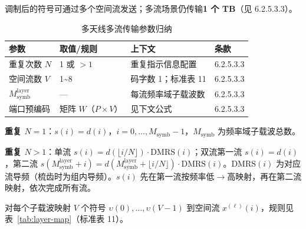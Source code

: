 \documentclass[11pt,a4paper]{ctexart}
\begin{document}
调制后的符号可通过多个空间流发送；多流场景仍传输\textbf{1 个 TB}（见 6.2.5.3.3）。

\begin{table}[h]
\centering
\small
\caption{多天线多流传输参数归纳}
\begin{tabular}{llll}
\toprule
\textbf{参数} & \textbf{取值/规则} & \textbf{上下文} & \textbf{条款} \\
\midrule
重复次数 $N$ & 1 或 $>1$ & 重复指示信息配置 & 6.2.5.3.3 \\
空间流数 $V$ & 1\textasciitilde 8 & 码字数 1；标准表 11 & 6.2.5.3.3 \\
$M_{\mathrm{symb}}^{\mathrm{layer}}$ & --- & 每流频率域子载波数 & 6.2.5.3.3 \\
端口预编码 & 矩阵 $W$（$P \times V$） & 见下文公式 & 6.2.5.3.3 \\
\bottomrule
\end{tabular}
\end{table}

\textbf{重复 $N=1$}：$s(i)=d(i)$，$i=0,\ldots,M_{\mathrm{symb}}-1$，$M_{\mathrm{symb}}$ 为频率域子载波总数。

\textbf{重复 $N>1$}：单流 $s(i)=d(\lfloor i/N\rfloor)\cdot\mathrm{DMRS}(i)$；双流第一流 $s(i)=d(i)$，第二流 $s(M_{\mathrm{symb}}^{\mathrm{layer}}+i)=d(M_{\mathrm{symb}}^{\mathrm{layer}}+\lfloor i/N\rfloor)\cdot\mathrm{DMRS}(i)$。$\mathrm{DMRS}(i)$ 为对应流导频（梳齿时为组内导频）。$s(i)$ 先在第一流按频率低$\rightarrow$高映射，再在第二流映射，依次完成所有流。

对每个子载波映射 $V$ 个符号 $\upsilon(0),\ldots,\upsilon(V-1)$ 到空间流 $x^{(\ell)}(i)$，规则见表~\ref{tab:layer-map}（标准表 11）。
\end{document}
